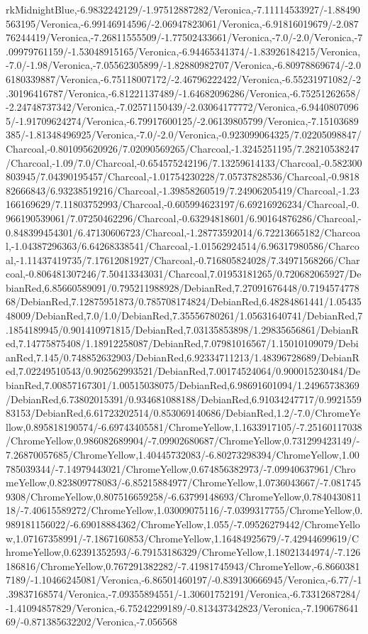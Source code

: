 {\begin{tikzternal}
rkMidnightBlue,-6.9832242129/-1.97512887282/Veronica,-7.11114533927/-1.88490563195/Veronica,-6.99146914596/-2.06947823061/Veronica,-6.91816019679/-2.08776244419/Veronica,-7.26811555509/-1.77502433661/Veronica,-7.0/-2.0/Veronica,-7.09979761159/-1.53048915165/Veronica,-6.94465341374/-1.83926184215/Veronica,-7.0/-1.98/Veronica,-7.05562305899/-1.82880982707/Veronica,-6.80978869674/-2.06180339887/Veronica,-6.75118007172/-2.46796222422/Veronica,-6.55231971082/-2.30196416787/Veronica,-6.81221137489/-1.64682096286/Veronica,-6.75251262658/-2.24748737342/Veronica,-7.02571150439/-2.03064177772/Veronica,-6.94408070965/-1.91709624274/Veronica,-6.79917600125/-2.06139805799/Veronica,-7.15103689385/-1.81348496925/Veronica,-7.0/-2.0/Veronica,-0.923099064325/7.02205098847/Charcoal,-0.801095620926/7.02090569265/Charcoal,-1.3245251195/7.28210538247/Charcoal,-1.09/7.0/Charcoal,-0.654575242196/7.13259614133/Charcoal,-0.582300803945/7.04390195457/Charcoal,-1.01754230228/7.05737828536/Charcoal,-0.981882666843/6.93238519216/Charcoal,-1.39858260519/7.24906205419/Charcoal,-1.23166169629/7.11803752993/Charcoal,-0.605994623197/6.69216926234/Charcoal,-0.966190539061/7.07250462296/Charcoal,-0.63294818601/6.90164876286/Charcoal,-0.848399454301/6.47130606723/Charcoal,-1.28773592014/6.72213665182/Charcoal,-1.04387296363/6.64268338541/Charcoal,-1.01562924514/6.96317980586/Charcoal,-1.11437419735/7.17612081927/Charcoal,-0.716805824028/7.34971568266/Charcoal,-0.806481307246/7.50413343031/Charcoal,7.01953181265/0.720682065927/DebianRed,6.85660589091/0.795211988928/DebianRed,7.27091676448/0.719457477868/DebianRed,7.12875951873/0.785708174824/DebianRed,6.48284861441/1.0543548009/DebianRed,7.0/1.0/DebianRed,7.35556780261/1.05631640741/DebianRed,7.1854189945/0.901410971815/DebianRed,7.03135853898/1.29835656861/DebianRed,7.14775875408/1.18912258087/DebianRed,7.07981016567/1.15010109079/DebianRed,7.145/0.748852632903/DebianRed,6.92334711213/1.48396728689/DebianRed,7.02249510543/0.902562993521/DebianRed,7.00174524064/0.900015230484/DebianRed,7.00857167301/1.00515038075/DebianRed,6.98691601094/1.24965738369/DebianRed,6.73802015391/0.934681088188/DebianRed,6.91034247717/0.992155983153/DebianRed,6.61723202514/0.853069140686/DebianRed,1.2/-7.0/ChromeYellow,0.895818190574/-6.69743405581/ChromeYellow,1.1633917105/-7.25160117038/ChromeYellow,0.986082689904/-7.09902680687/ChromeYellow,0.731299423149/-7.26870057685/ChromeYellow,1.40445732083/-6.80273298394/ChromeYellow,1.00785039344/-7.14979443021/ChromeYellow,0.674856382973/-7.09940637961/ChromeYellow,0.823809778083/-6.85215884977/ChromeYellow,1.0736043667/-7.0817459308/ChromeYellow,0.807516659258/-6.63799148693/ChromeYellow,0.784043081118/-7.40615589272/ChromeYellow,1.03009075116/-7.0399317755/ChromeYellow,0.989181156022/-6.69018884362/ChromeYellow,1.055/-7.09526279442/ChromeYellow,1.07167358991/-7.1867160853/ChromeYellow,1.16484925679/-7.42944699619/ChromeYellow,0.62391352593/-6.79153186329/ChromeYellow,1.18021344974/-7.126186816/ChromeYellow,0.767291382282/-7.41981745943/ChromeYellow,-6.86603817189/-1.10466245081/Veronica,-6.86501460197/-0.839130666945/Veronica,-6.77/-1.39837168574/Veronica,-7.09355894551/-1.30601752191/Veronica,-6.73312687284/-1.41094857829/Veronica,-6.75242299189/-0.813437342823/Veronica,-7.19067864169/-0.871385632202/Veronica,-7.056568
\end{tikzternal}}
